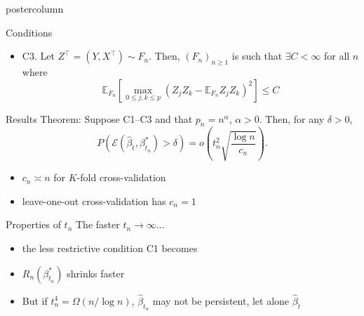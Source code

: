 \documentclass[final]{beamer}
\newcommand{\alr}[1]{\textcolor{redmain}{#1}}
\newcommand{\alb}[1]{\textcolor{bluemain}{#1}}
\newcommand{\tCV}{\widehat{t}}
\renewcommand{\hat}{\widehat}
\newcommand{\vsp}{\vspace{.2in}}
\newcommand{\bluebox}{\hspace{1em}\alb{\raisebox{.25ex}{\rule{1ex}{1ex}}}\hspace{1ex}}
\newcommand{\redbox}{\hspace{1em}\alr{\raisebox{.25ex}{\rule{1ex}{1ex}}}\hspace{1ex}}
\begin{document}
\begin{frame}
\begin{columns}
\begin{column}{.49\textwidth}
\begin{beamercolorbox}[center,wd=\textwidth]{postercolumn}
\begin{minipage}[T]{.96\textwidth}
{\begin{block}{Conditions}
\begin{itemize}
                \vsp
                \bluebox $v \cap v' = \emptyset$
                \vsp
              \item[]\alb{C3.} Let $Z^\top =
                (Y,X^\top) \sim F_n$.  Then, $(F_n)_{n \geq 1}$ is such
                that  
                $\exists C \!<\!\infty$ for all $n$  where 
                \[
                \mathbb{E}_{F_n} \left[\max_{0 \leq j,k \leq p} (Z_j Z_k -
                \mathbb{E}_{F_n} Z_j Z_k )^2\right] \!\leq \!C   
                \]
                \vsp
              \end{itemize}
            \end{block}	
            \vfill
            \begin{alertblock}{Results}		
              {\sc \alb{Theorem:}} Suppose  
              \alb{C1}--\alb{C3} and that $p_n = n^{\alpha}$, $\alpha > 0$.
              Then, for any $\delta > 0$,
              \begin{equation*}
                P(    \mathcal{E}(\hat\beta_{\tCV},\beta^*_{t_n}) >
                \delta)  = o\left (t_n^2\sqrt{\frac{\log
                      n}{c_n}}\right). 
              \end{equation*}
              \vsp
              
              \begin{itemize}
              \item[]\redbox $c_n \asymp n$ for $K$-fold
                cross-validation
                \vsp
              \item[]\redbox leave-one-out cross-validation has $c_n = 1$
              \end{itemize}
            \end{alertblock}
            \vfill
            \begin{block}{Properties of $t_n$}
              The faster $t_n \rightarrow \infty \ldots$
              \vsp

              \begin{itemize}
              \item[]\bluebox the less restrictive condition
                \alb{C1} becomes
                \vsp
              \item[]\bluebox $R_n(\beta^*_{t_n})$ shrinks faster
                \vsp
              \item[]\bluebox But if $t_n^4 =\Omega(n/\log n)$,
                  $\hat\beta_{t_n}$ may not be persistent, let alone $\hat\beta_{\tCV}$
              \end{itemize}
              

\end{block}}
\end{minipage}
\end{beamercolorbox}
\end{column}
\end{columns}
\end{frame}
\end{document}
